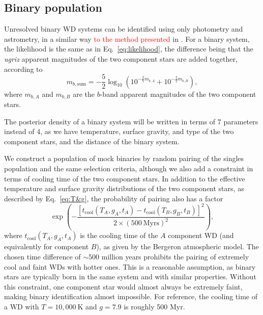\documentclass[fleqn,usenatbib]{mnras}
\newcommand{\changes}[1]{\textcolor{red}{#1}}
\newcommand{\Teff}{T}
\newcommand{\logg}{g}
\newcommand{\K}{\text{K}}
\begin{document}
\subsection{Binary population}

Unresolved binary WD systems can be identified using only photometry and astrometry, in a similar way \changes{to the method presented} in \cite{2018ApJ...857..114W}. For a binary system, the likelihood is the same as in Eq.~\eqref{eq:likelihood}, the difference being that the \emph{ugriz} apparent magnitudes of the two component stars are added together, according to
\begin{equation}
	m_{b,\text{sum}} = - \frac{5}{2}\log_{10}\left( 10^{-\frac{2}{5}m_{b,A}}+10^{-\frac{2}{5}m_{b,B}}  \right),
\end{equation}
where $m_{b,A}$ and $m_{b,B}$ are the $b$-band apparent magnitudes of the two component stars.

The posterior density of a binary system will be written in terms of 7 parameters instead of 4, as we have temperature, surface gravity, and type of the two component stars, and the distance of the binary system.

We construct a population of mock binaries by random pairing of the singles population and the same selection criteria, although we also add a constraint in terms of cooling time of the two component stars. In addition to the effective temperature and surface gravity distributions of the two component stars, as described by Eq.~\eqref{eq:T&g}, the probability of pairing also has a factor
\begin{equation}\label{eq:time_difference}
	\exp\left(
	-\frac{[t_\text{cool}(\Teff_A,\logg_A,t_A)-t_\text{cool}(\Teff_B,\logg_B,t_B)]^2}{2\times ( 500~\text{Myrs})^2}
	\right),
\end{equation}
where $t_\text{cool}(\Teff_A,\logg_A,t_A)$ is the cooling time of the $A$ component WD (and equivalently for component $B$), as given by the Bergeron atmospheric model. The chosen time difference of $\sim 500$ million years prohibits the pairing of extremely cool and faint WDs with hotter ones. This is a reasonable assumption, as binary stars are typically born in the same system and with similar properties. Without this constraint, one component star would almost always be extremely faint, making binary identification almost impossible. For reference, the cooling time of a WD with $\Teff=10,000~\K$ and $\logg=7.9$ is roughly 500 Myr.
\end{document}
